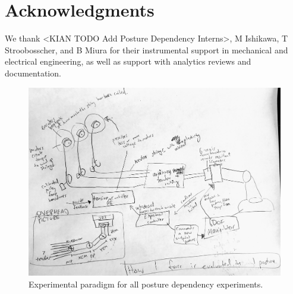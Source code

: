 \documentclass[utf8]{frontiersSCNS} %
\begin{document}
\section*{Acknowledgments}
We thank <KIAN TODO Add Posture Dependency Interns>, M Ishikawa, T Stroobosscher, and B Miura for their instrumental support in mechanical and electrical engineering, as well as support with analytics reviews and documentation.



\begin{figure}[h!]
\begin{center}
\includegraphics[width=15cm]{figures/overview/overview.jpg}%
\end{center}
\caption{Experimental paradigm for all posture dependency experiments.}
\label{fig:overview}
\end{figure}
\end{document}

